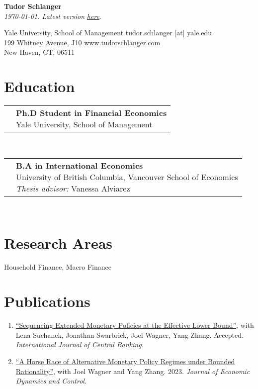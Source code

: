 \documentclass[letterpaper,10pt]{article}
\newcommand{\educItem}[4]{
		\vspace{0.2em} 	\begin{tabular*}{0.99\textwidth}[t]{lp{\labelsep}}
	      \eqparbox[t]{dates}{\ \ \ \ #1 \ \ \ \ } & \eqparbox[t]{educList}{\textbf{#2} \\ #3 \\ #4}
	   \end{tabular*} \vspace{0.2em} \\
		}
\newcommand{\pubSubHeadingListStart}{\begin{enumerate}[leftmargin=1em]}
\newcommand{\pubSubHeadingListEnd}{\end{enumerate}\vspace{-5pt}}
\newcommand{\pubItem}[3]{
	  \item{
	    \href{#1}{``#2''}{, with #3 \vspace{-2pt}}
	  }
	}
\begin{document}

\begin{center}
    \textbf{\Large  Tudor Schlanger} \\
    \textit{\today. Latest version} \href{https://raw.githubusercontent.com/tudorschlanger/cv/main/cv.pdf}{\textit{here}}.
\end{center}

Yale University, School of Management \hfill tudor.schlanger [at] yale.edu\\
199 Whitney Avenue, J10  			  \hfill \href{https://www.tudorschlanger.com}{www.tudorschlanger.com} \\
New Haven, CT, 06511				  \hfill  


\section{Education}
\educItem{2023-Present}{Ph.D Student in Financial Economics}{Yale University, School of Management}{} 
\educItem{2019}{B.A in International Economics}{University of British Columbia, Vancouver School of Economics}{\textit{Thesis advisor:} Vanessa Alviarez} 

\section{Research Areas}

\hspace{1em} Household Finance, Macro Finance



\section{Publications}

\pubSubHeadingListStart
	\pubItem{https://www.bankofcanada.ca/wp-content/uploads/2021/07/sdp2021-10.pdf}{Sequencing Extended Monetary Policies at the Effective Lower Bound}{Lena Suchanek, Jonathan Swarbrick, Joel Wagner, Yang Zhang. Accepted. \textit{International Journal of Central Banking.}}
	\pubItem{https://www.dropbox.com/scl/fi/j163cbxanc4ij4jcdauxt/draft_paper_20230724_prepublish.pdf?rlkey=zgvazmtdvw3xdgurn0ry6qykb&e=1&dl=0}{A Horse Race of Alternative Monetary Policy Regimes under Bounded Rationality}{Joel Wagner and Yang Zhang. 2023. \textit{Journal of Economic Dynamics and Control. }}
\pubSubHeadingListEnd
\end{document}
